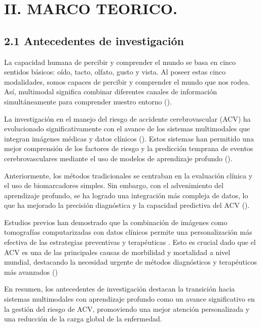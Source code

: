 \section{II. MARCO TEORICO.} \label{cap:CAPII}

\subsection{2.1 Antecedentes de investigación}

La capacidad humana de percibir y comprender el mundo se basa en cinco sentidos básicos: oído, tacto, olfato, gusto y vista. Al poseer estas cinco modalidades, somos capaces de percibir y comprender el mundo que nos rodea. Así, multimodal significa combinar diferentes canales de información simultáneamente para comprender nuestro entorno (\cite{akkus2023multimodaldeeplearning}). 
\newline

La investigación en el manejo del riesgo de accidente cerebrovascular (ACV) ha evolucionado significativamente con el avance de los sistemas multimodales que integran imágenes médicas y datos clínicos (\cite{Cui_2023}). Estos sistemas han permitido una mejor comprensión de los factores de riesgo y la predicción temprana de eventos cerebrovasculares mediante el uso de modelos de aprendizaje profundo (\cite{9985596}).
\newline

Anteriormente, los métodos tradicionales se centraban en la evaluación clínica y el uso de biomarcadores simples. Sin embargo, con el advenimiento del aprendizaje profundo, se ha logrado una integración más compleja de datos, lo que ha mejorado la precisión diagnóstica y la capacidad predictiva del ACV (\cite{CuiLStroke}).
\newline

Estudios previos han demostrado que la combinación de imágenes como tomografías computarizadas con datos clínicos permite una personalización más efectiva de las estrategias preventivas y terapéuticas . Esto es crucial dado que el ACV es una de las principales causas de morbilidad y mortalidad a nivel mundial, destacando la necesidad urgente de métodos diagnósticos y terapéuticos más avanzados (\cite{s21020460,app10196791})
\newline

En resumen, los antecedentes de investigación destacan la transición hacia sistemas multimodales con aprendizaje profundo como un avance significativo en la gestión del riesgo de ACV, promoviendo una mejor atención personalizada y una reducción de la carga global de la enfermedad.

